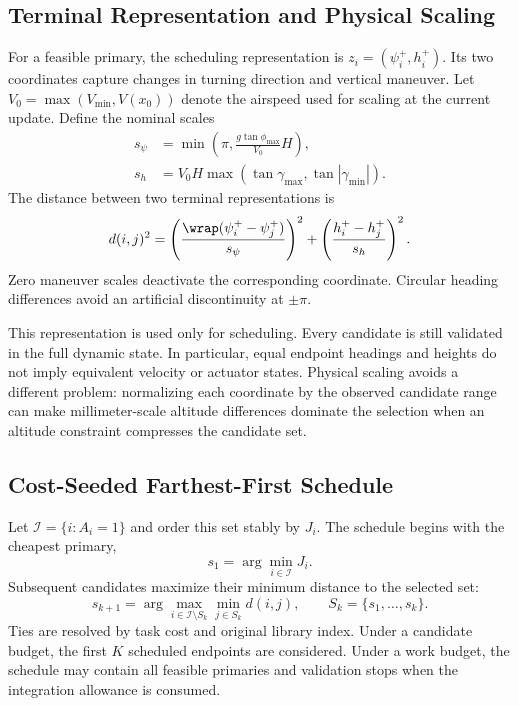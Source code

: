 \subsection{Terminal Representation and Physical Scaling}
For a feasible primary, the scheduling representation is $z_i=(\psi_i^+,h_i^+)$. Its two coordinates capture changes in turning direction and vertical maneuver. Let $V_0=\max(V_{\min},V(x_0))$ denote the airspeed used for scaling at the current update. Define the nominal scales
\begin{align}
 s_\psi&=\min\left(\pi,\frac{g\tan\phi_{\max}}{V_0}H\right),\\
 s_h&=V_0H\max(\tan\gamma_{\max},\tan|\gamma_{\min}|).
\end{align}
The distance between two terminal representations is
\begin{equation}
 d(i,j)^2=\left(\frac{\wrap(\psi_i^+-\psi_j^+)}{s_\psi}\right)^2
             +\left(\frac{h_i^+-h_j^+}{s_h}\right)^2. \label{eq:metric}
\end{equation}
Zero maneuver scales deactivate the corresponding coordinate. Circular heading differences avoid an artificial discontinuity at $\pm\pi$.

This representation is used only for scheduling. Every candidate is still validated in the full dynamic state. In particular, equal endpoint headings and heights do not imply equivalent velocity or actuator states. Physical scaling avoids a different problem: normalizing each coordinate by the observed candidate range can make millimeter-scale altitude differences dominate the selection when an altitude constraint compresses the candidate set.

\subsection{Cost-Seeded Farthest-First Schedule}
Let $\mathcal I=\{i:A_i=1\}$ and order this set stably by $J_i$. The schedule begins with the cheapest primary,
\begin{equation}
 s_1=\arg\min_{i\in\mathcal I}J_i.
\end{equation}
Subsequent candidates maximize their minimum distance to the selected set:
\begin{equation}
 s_{k+1}=\arg\max_{i\in\mathcal I\setminus S_k}
                       \min_{j\in S_k}d(i,j),\qquad
 S_k=\{s_1,\ldots,s_k\}. \label{eq:schedule}
\end{equation}
Ties are resolved by task cost and original library index. Under a candidate budget, the first $K$ scheduled endpoints are considered. Under a work budget, the schedule may contain all feasible primaries and validation stops when the integration allowance is consumed.

